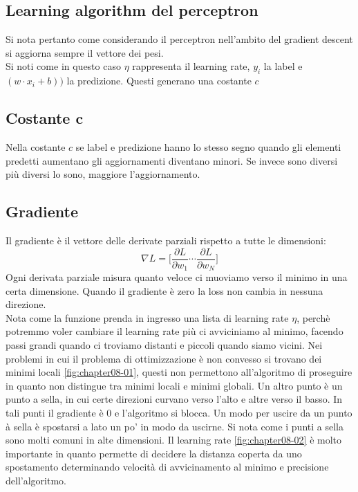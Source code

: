 	\subsection{Learning algorithm del perceptron}
	Si nota pertanto come considerando il perceptron nell'ambito del gradient descent si aggiorna sempre il vettore dei pesi.\\
	
	Si noti come in questo caso $\eta$ rappresenta il learning rate, $y_i$ la label e $(w\cdot x_i + b))$ la predizione.
	Questi generano una costante $c$

	\subsection{Costante $\mathbf{c}$}
	Nella costante $c$ se label e predizione hanno lo stesso segno quando gli elementi predetti aumentano gli aggiornamenti diventano minori.
	Se invece sono diversi pi\`u diversi lo sono, maggiore l'aggiornamento.
	
	\subsection{Gradiente}
	Il gradiente \`e il vettore delle derivate parziali rispetto a tutte le dimensioni:
	$$\nabla L = \biggl[\dfrac{\partial L}{\partial w_1}\cdots\dfrac{\partial L}{\partial w_N}\biggr]$$
	Ogni derivata parziale misura quanto veloce ci muoviamo verso il minimo in una certa dimensione.
	Quando il gradiente \`e zero la loss non cambia in nessuna direzione.\\
	
	Nota come la funzione prenda in ingresso una lista di learning rate $\eta$, perch\`e potremmo voler cambiare il learning rate pi\`u ci avviciniamo al minimo, facendo passi grandi quando ci troviamo distanti e piccoli quando siamo vicini.
	Nei problemi in cui il problema di ottimizzazione \`e non convesso si trovano dei minimi locali \ref{fig:chapter08-01}, questi non permettono all'algoritmo di proseguire in quanto non distingue tra minimi locali e minimi globali.
	Un altro punto \`e un punto a sella, in cui certe direzioni curvano verso l'alto e altre verso il basso.
	In tali punti il gradiente \`e $0$ e l'algoritmo si blocca.
	Un modo per uscire da un punto \`a sella \`e spostarsi a lato un po' in modo da uscirne.
	Si nota come i punti a sella sono molti comuni in alte dimensioni.
	Il learning rate \ref{fig:chapter08-02} \`e molto importante in quanto permette di decidere la distanza coperta da uno spostamento determinando velocit\`a di avvicinamento al minimo e precisione dell'algoritmo.
	
